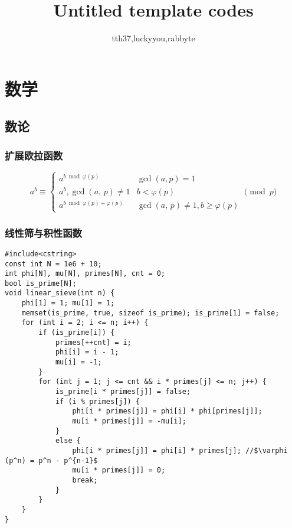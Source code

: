 \documentclass[UTF8]{article}
\title{Untitled template codes}
\author{tth37,luckyyou,rabbyte}
\begin{document}
    \maketitle
    \setcounter{page}{0}
    \thispagestyle{empty}
    \clearpage
    \tableofcontents
    \clearpage
    \section{数学}
        \subsection{数论}
            \subsubsection{扩展欧拉函数}
            $$
            a^b\equiv
            \begin{cases}
                a^{b\bmod\varphi(p)} & \gcd(a,p)=1\\
                a^b,\gcd(a,\,p)\ne1 & b<\varphi(p)\\
                a^{b\bmod\varphi(p)+\varphi(p)} & \gcd(a,\,p)\ne1,b\ge\varphi(p)
            \end{cases}
            \pmod p
            $$
            \subsubsection{线性筛与积性函数}
            \begin{verbatim}
#include<cstring>
const int N = 1e6 + 10;
int phi[N], mu[N], primes[N], cnt = 0;
bool is_prime[N];
void linear_sieve(int n) {
    phi[1] = 1; mu[1] = 1;
    memset(is_prime, true, sizeof is_prime); is_prime[1] = false;
    for (int i = 2; i <= n; i++) {
        if (is_prime[i]) {
            primes[++cnt] = i;
            phi[i] = i - 1;
            mu[i] = -1;
        }
        for (int j = 1; j <= cnt && i * primes[j] <= n; j++) {
            is_prime[i * primes[j]] = false;
            if (i % primes[j]) {
                phi[i * primes[j]] = phi[i] * phi[primes[j]];
                mu[i * primes[j]] = -mu[i];
            }
            else {
                phi[i * primes[j]] = phi[i] * primes[j]; //$\varphi (p^n) = p^n - p^{n-1}$
                mu[i * primes[j]] = 0;
                break;
            }
        }
    }
}
            \end{verbatim}
\end{document}
